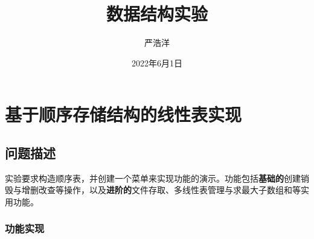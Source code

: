 \documentclass[supercite]{Experimental_Report}
\title{~~~~~~数据结构实验~~~~~~}
\author{严浩洋}
\date{2022年6月1日}
\theoremstyle{definition}
\begin{document}
\maketitle

\clearpage


\tableofcontents[level=2]

\clearpage


\section{基于顺序存储结构的线性表实现}


\subsection{问题描述}
实验要求构造顺序表，并创建一个菜单来实现功能的演示。功能包括\textbf{基础的}创建销毁与增删改查等操作，以及\textbf{进阶的}文件存取、多线性表管理与求最大子数组和等实用功能。

\subsubsection{功能实现}
\end{document}
